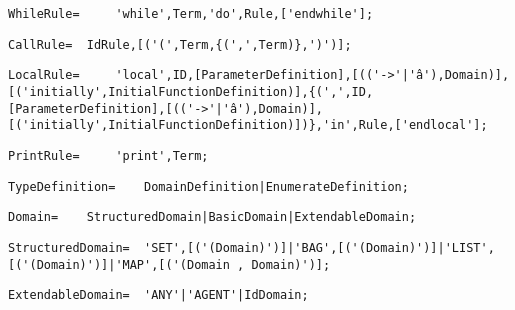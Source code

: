\documentclass{article}
\begin{document}
    \begin{flushleft}
    \begin{lstlisting}[mathescape=true, breaklines=true]
     WhileRule= 	'while',Term,'do',Rule,['endwhile'];
    \end{lstlisting}
    \end{flushleft}
    \begin{flushleft}
    \begin{lstlisting}[mathescape=true, breaklines=true]
     CallRule= 	IdRule,[('(',Term,{(',',Term)},')')];
    \end{lstlisting}
    \end{flushleft}
    \begin{flushleft}
    \begin{lstlisting}[mathescape=true, breaklines=true]
     LocalRule= 	'local',ID,[ParameterDefinition],[(('->'|'â'),Domain)],[('initially',InitialFunctionDefinition)],{(',',ID,[ParameterDefinition],[(('->'|'â'),Domain)],[('initially',InitialFunctionDefinition)])},'in',Rule,['endlocal'];
    \end{lstlisting}
    \end{flushleft}
    \begin{flushleft}
    \begin{lstlisting}[mathescape=true, breaklines=true]
     PrintRule= 	'print',Term;
    \end{lstlisting}
    \end{flushleft}
    \begin{flushleft}
    \begin{lstlisting}[mathescape=true, breaklines=true]
     TypeDefinition= 	DomainDefinition|EnumerateDefinition;
    \end{lstlisting}
    \end{flushleft}
    \begin{flushleft}
    \begin{lstlisting}[mathescape=true, breaklines=true]
     Domain= 	StructuredDomain|BasicDomain|ExtendableDomain;
    \end{lstlisting}
    \end{flushleft}
    \begin{flushleft}
    \begin{lstlisting}[mathescape=true, breaklines=true]
     StructuredDomain= 	'SET',[('(Domain)')]|'BAG',[('(Domain)')]|'LIST',[('(Domain)')]|'MAP',[('(Domain , Domain)')];
    \end{lstlisting}
    \end{flushleft}
    \begin{flushleft}
    \begin{lstlisting}[mathescape=true, breaklines=true]
     ExtendableDomain= 	'ANY'|'AGENT'|IdDomain;
    \end{lstlisting}
    \end{flushleft}
\end{document}
